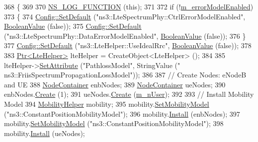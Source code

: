 \begin{DoxyCode}
368 \{
369 
370   \hyperlink{log-macros-disabled_8h_a90b90d5bad1f39cb1b64923ea94c0761}{NS\_LOG\_FUNCTION} (\textcolor{keyword}{this});
371 
372   \textcolor{keywordflow}{if} (!\hyperlink{classLenaTdBetFfMacSchedulerTestCase2_aedf7576a6b04173f851c1d3c074fc292}{m\_errorModelEnabled})
373     \{
374       \hyperlink{group__config_ga2e7882df849d8ba4aaad31c934c40c06}{Config::SetDefault} (\textcolor{stringliteral}{"ns3::LteSpectrumPhy::CtrlErrorModelEnabled"}, 
      \hyperlink{classns3_1_1BooleanValue}{BooleanValue} (\textcolor{keyword}{false}));
375       \hyperlink{group__config_ga2e7882df849d8ba4aaad31c934c40c06}{Config::SetDefault} (\textcolor{stringliteral}{"ns3::LteSpectrumPhy::DataErrorModelEnabled"}, 
      \hyperlink{classns3_1_1BooleanValue}{BooleanValue} (\textcolor{keyword}{false}));
376     \}
377   \hyperlink{group__config_ga2e7882df849d8ba4aaad31c934c40c06}{Config::SetDefault} (\textcolor{stringliteral}{"ns3::LteHelper::UseIdealRrc"}, 
      \hyperlink{classns3_1_1BooleanValue}{BooleanValue} (\textcolor{keyword}{false}));
378 
383   \hyperlink{classns3_1_1Ptr}{Ptr<LteHelper>} lteHelper = CreateObject<LteHelper> ();
384   
385   lteHelper->\hyperlink{classns3_1_1ObjectBase_ac60245d3ea4123bbc9b1d391f1f6592f}{SetAttribute} (\textcolor{stringliteral}{"PathlossModel"}, StringValue (\textcolor{stringliteral}{"
      ns3::FriisSpectrumPropagationLossModel"}));
386 
387   \textcolor{comment}{// Create Nodes: eNodeB and UE}
388   \hyperlink{classns3_1_1NodeContainer}{NodeContainer} enbNodes;
389   \hyperlink{classns3_1_1NodeContainer}{NodeContainer} ueNodes;
390   enbNodes.\hyperlink{classns3_1_1NodeContainer_a787f059e2813e8b951cc6914d11dfe69}{Create} (1);
391   ueNodes.\hyperlink{classns3_1_1NodeContainer_a787f059e2813e8b951cc6914d11dfe69}{Create} (\hyperlink{classLenaTdBetFfMacSchedulerTestCase2_ae922bc33ece9e8c61eaf4677b8b78f6b}{m\_nUser});
392 
393   \textcolor{comment}{// Install Mobility Model}
394   \hyperlink{classns3_1_1MobilityHelper}{MobilityHelper} mobility;
395   mobility.\hyperlink{classns3_1_1MobilityHelper_a030275011b6f40682e70534d30280aba}{SetMobilityModel} (\textcolor{stringliteral}{"ns3::ConstantPositionMobilityModel"});
396   mobility.\hyperlink{classns3_1_1MobilityHelper_a07737960ee95c0777109cf2994dd97ae}{Install} (enbNodes);
397   mobility.\hyperlink{classns3_1_1MobilityHelper_a030275011b6f40682e70534d30280aba}{SetMobilityModel} (\textcolor{stringliteral}{"ns3::ConstantPositionMobilityModel"});
398   mobility.\hyperlink{classns3_1_1MobilityHelper_a07737960ee95c0777109cf2994dd97ae}{Install} (ueNodes);

\end{DoxyCode}
